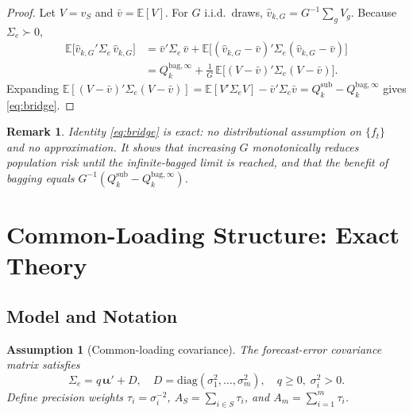 \documentclass[12pt,a4paper]{article}
\newtheorem{remark}{Remark}
\newtheorem{assumption}{Assumption}
\theoremstyle{definition}
\newcommand{\Sig}{\Sigma_e}
\newcommand{\Qbag}{Q_k^{\mathrm{bag},\infty}}
\newcommand{\E}{\mathbb{E}}
\begin{document}
\begin{proof}
Let $V=v_S$ and $\bar v=\E[V]$.  For $G$ i.i.d.\ draws,
$\hat v_{k,G}=G^{-1}\sum_g V_g$.  Because $\Sig\succ 0$,
\begin{align*}
\E\bigl[\hat v_{k,G}'\Sig\,\hat v_{k,G}\bigr]
  &= \bar v'\Sig\,\bar v
    +\E\bigl[(\hat v_{k,G}-\bar v)'\Sig(\hat v_{k,G}-\bar v)\bigr]\\
  &= \Qbag
    +\frac{1}{G}\,\E\bigl[(V-\bar v)'\Sig(V-\bar v)\bigr].
\end{align*}
Expanding $\E[(V-\bar v)'\Sig(V-\bar v)]=\E[V'\Sig V]-\bar v'\Sig\bar v
=Q_k^{\mathrm{sub}}-\Qbag$ gives \eqref{eq:bridge}.
\end{proof}

\begin{remark}
Identity \eqref{eq:bridge} is exact: no distributional assumption on
$\{f_t\}$ and no approximation.  It shows that increasing $G$ monotonically
reduces population risk until the infinite-bagged limit is reached, and
that the benefit of bagging equals $G^{-1}(Q_k^{\mathrm{sub}}-\Qbag)$.
\end{remark}

\section{Common-Loading Structure: Exact Theory}
\label{sec:cl}

\subsection{Model and Notation}

\begin{assumption}[Common-loading covariance]\label{ass:cl}
The forecast-error covariance matrix satisfies
\begin{equation}\label{eq:Sigma}
  \Sig = q\,\bm{\iota}\bm{\iota}' + D,\quad
  D=\mathrm{diag}(\sigma_1^2,\ldots,\sigma_m^2),\quad q\ge 0,\;\sigma_i^2>0.
\end{equation}
Define \emph{precision weights} $\tau_i=\sigma_i^{-2}$,
$A_S=\sum_{i\in S}\tau_i$, and $A_m=\sum_{i=1}^m\tau_i$.
\end{assumption}
\end{document}
